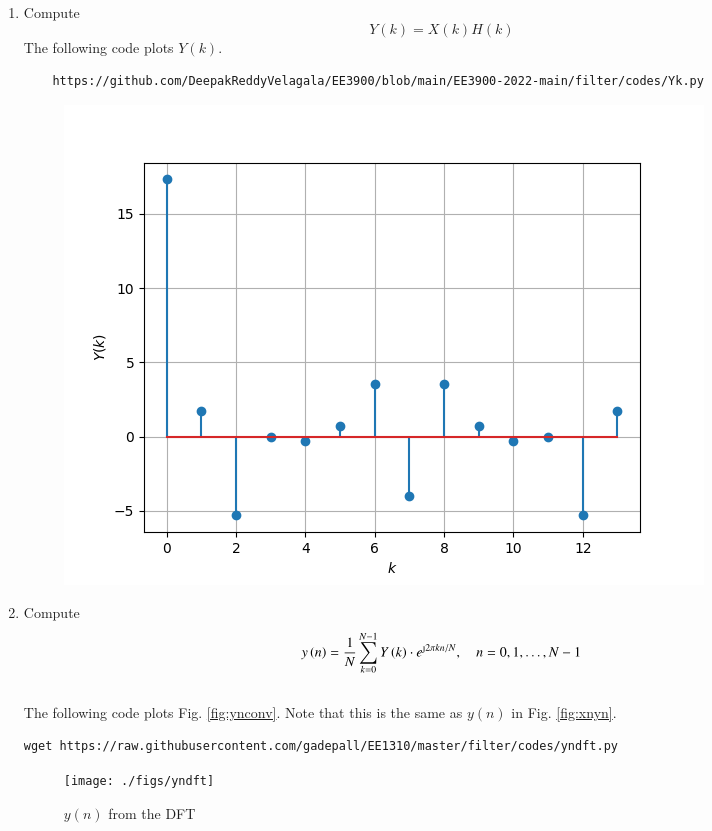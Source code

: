 \documentclass[journal,12pt,twocolumn]{IEEEtran}
\renewcommand\thesection{\arabic{section}}
\begin{document}
\begin{enumerate}[label=\thesection.\arabic*]
\item Compute 
\begin{equation}
Y(k) = X(k)H(k)
\end{equation}
\solution The following code plots $Y(k)$.
\begin{lstlisting}
    https://github.com/DeepakReddyVelagala/EE3900/blob/main/EE3900-2022-main/filter/codes/Yk.py
\end{lstlisting}
\begin{figure}[!ht]
\centering
\includegraphics[width=\columnwidth]{figs/Yk.png}
\caption{}
\label{fig:Yk}
\end{figure}

\item Compute
\begin{equation}
 y\brak{n}={\frac {1}{N}}\sum _{k=0}^{N-1}Y\brak{k}\cdot e^{\text{\j} 2\pi kn/N},\quad n = 0,1,\dots, N-1
\end{equation}
\\
\solution The following code plots Fig. \ref{fig:ynconv}. Note that this is the same as 
$y(n)$ in  Fig. 
\ref{fig:xnyn}. 
%
\begin{lstlisting}
wget https://raw.githubusercontent.com/gadepall/EE1310/master/filter/codes/yndft.py
\end{lstlisting}
\begin{figure}[!ht]
\centering
\texttt{[image: ./figs/yndft]}
\caption{$y(n)$ from the DFT}
\label{fig:yndft}
\end{figure}


\end{enumerate}
\end{document}
